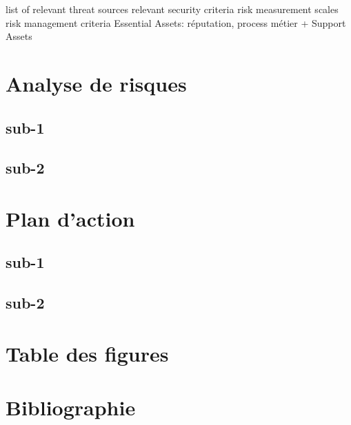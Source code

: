 \documentclass[12pt]{article}
\begin{document}
\justify
list of relevant threat sources
\justify
relevant security criteria
\justify
risk measurement scales
\justify
risk management criteria
\justify
Essential Assets: réputation, process métier + Support Assets



\section{Analyse de risques}

\subsection{sub-1}

\subsection{sub-2}

\section{Plan d'action}

\subsection{sub-1}

\subsection{sub-2}


\newpage


\section*{Table des figures}
\makeatletter
{}%
\makeatother
{}%


\nocite{*}
\section*{Bibliographie}
\printbibliography[heading=none]
%

\end{document}

